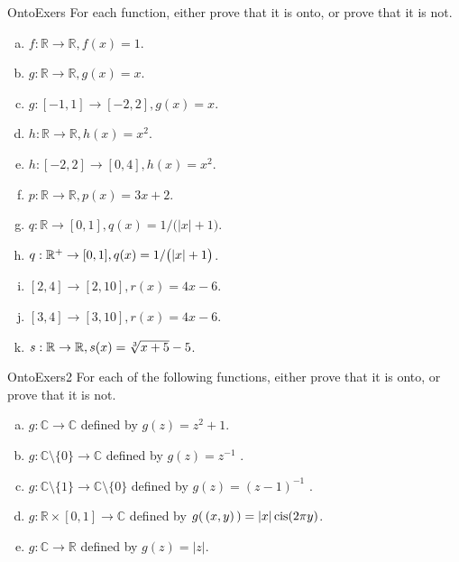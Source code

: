 \begin{exercise}{OntoExers} 
For each function, either prove that it is onto, or prove that it is not.
\begin{multicols}{2}
\begin{enumerate}[(a)]
\item \label{OntoExers-formula-a(x)}
 $f: \mathbb{R} \rightarrow \mathbb{R}, f(x) = 1$.
\item \label{OntoExers-formula-b(x)}
 $g: \mathbb{R} \rightarrow \mathbb{R}, g(x) = x$.
\item \label{OntoExers-formula-b(x)2}
 $g: [-1,1] \rightarrow [-2,2], g(x) = x$.
\item \label{OntoExers-formula-c(x)}
 $h: \mathbb{R} \rightarrow \mathbb{R}, h(x) = x^2$.
\item \label{OntoExers-formula-c(x)2}
 $h: [-2,2] \rightarrow [0,4], h(x) = x^2$.
\item \label{OntoExers-formula-p(x)}
 $p: \mathbb{R} \rightarrow \mathbb{R}, p(x) = 3x + 2$.
\item \label{OntoExers-formula-q(x)}
 $q: \mathbb{R} \rightarrow [0,1], q(x) = 1/ \bigl( |x| + 1 \bigr)$.
\item \label{OntoExers-formula-q(x)2}
 $q: \mathbb{R}^+ \rightarrow [0,1], \\q(x) = 1/ \bigl( |x| + 1 \bigr)$.
\item \label{OntoExers-formula-r(x)}
 $[2,4] \rightarrow [2,10], r(x) = 4x - 6$.
\item \label{OntoExers-formula-r(x)2}
 $[3,4] \rightarrow [3,10], r(x) = 4x - 6$.
\item \label{OntoExers-formula-s(x)}
 $s: \mathbb{R} \rightarrow \mathbb{R}, s(x) = \root 3 \of {x+5} - 5$.
\end{enumerate}
\end{multicols}
\end{exercise}


\begin{exercise}{OntoExers2}
For each of the following  functions, either prove that it is onto, or prove that it is not.
\begin{enumerate}[(a)]
\item
 $g \colon {\mathbb C}  \to {\mathbb C} $ defined by $g(z) =  z^2+1$.
\item
 $g \colon {\mathbb C}\setminus \{0\}  \to {\mathbb C} $ defined by $g(z) =  z^{-1}$ .
\item
 $g \colon {\mathbb C}\setminus \{1\}  \to {\mathbb C}\setminus \{0\} $ defined by $g(z) =  (z-1)^{-1}$ .
\item
 $g \colon {\mathbb R} \times [0,1]  \to {\mathbb C} $ defined by $g(\,(x,y)\,) =  |x| \operatorname{cis} ( 2\pi y)$.
 \item
 $g \colon {\mathbb C}  \to {\mathbb R} $ defined by $g(z) = |z|$.
 
\end{enumerate}
\end{exercise}


